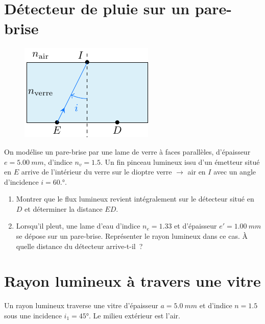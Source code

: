 \documentclass[../../main/main.tex]{subfiles}
\begin{document}
\section{Détecteur de pluie sur un pare-brise}
\begin{figure}
	\vspace*{10pt}
	\centering
	\includegraphics[width=\linewidth]{pluie_plain.pdf}
	\label{fig:pluie_plain}
\end{figure}
On modélise un pare-brise par une lame de verre à faces parallèles, d'épaisseur
$e = \SI{5.00}{mm}$, d'indice $n_v = \num{1.5}$. Un fin pinceau lumineux issu d'un
émetteur situé en $E$ arrive de l'intérieur du verre sur le dioptre verre
$\rightarrow$ air en $I$ avec un angle d'incidence $i = \ang{60.;;}$.
\begin{enumerate}
	\item Montrer que le flux lumineux revient intégralement sur le détecteur
	      situé en $D$ et déterminer la distance $ED$.
	\item Lorsqu'il pleut, une lame d'eau d'indice $n_e = \num{1.33}$ et
	      d'épaisseur $e' = \SI{1.00}{mm}$ se dépose sur un pare-brise. Représenter
	      le rayon lumineux dans ce cas. À quelle distance du détecteur
	      arrive-t-il~?
\end{enumerate}

\section{Rayon lumineux à travers une vitre}
Un rayon lumineux traverse une vitre d'épaisseur $a = \SI{5.0}{mm}$ et d'indice
$n = \num{1.5}$ sous une incidence $i_1 = \ang{45;;}$. Le milieu extérieur est
l'air.
\end{document}
